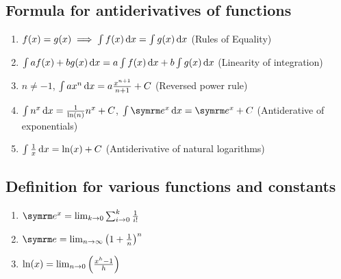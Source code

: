 \subsection{Formula for antiderivatives of functions}

\begin{enumerate}
    \item $f(x) = g(x) \implies \int f(x)\odif{x} = \int g(x)\odif{x}$ (Rules of Equality)
    \item $\int af(x) + bg(x) \odif{x} = a\int f(x)\odif{x} + b\int g(x)\odif{x}$ (Linearity of integration)
    \item $n \neq -1$, $\int ax^n\odif{x} = a\frac{x^{n + 1}}{n + 1} + C$ (Reversed power rule)
    \item $\int n^x\odif{x} = \frac{1}{\ln(n)}n^x + C$, $\int \e^x\odif{x} = \e^x + C$ (Antiderative of exponentials)
    \item $\int \frac{1}{x}\odif{x} = \ln(x) + C$ (Antiderivative of natural logarithms)
\end{enumerate}

\subsection{Definition for various functions and constants}

\begin{enumerate}
    \item $\e^x = \lim_{k \appr 0}\sum_{i \appr 0}^{k}\frac{1}{i!}$
    \item $\e = \lim_{n \appr \infty}\left(1 + \frac{1}{n}\right)^n$
    \item $\ln(x) = \lim_{n \rightarrow 0}\left(\frac{x^h - 1}{h}\right)$
\end{enumerate}

\everymath{\textstyle}